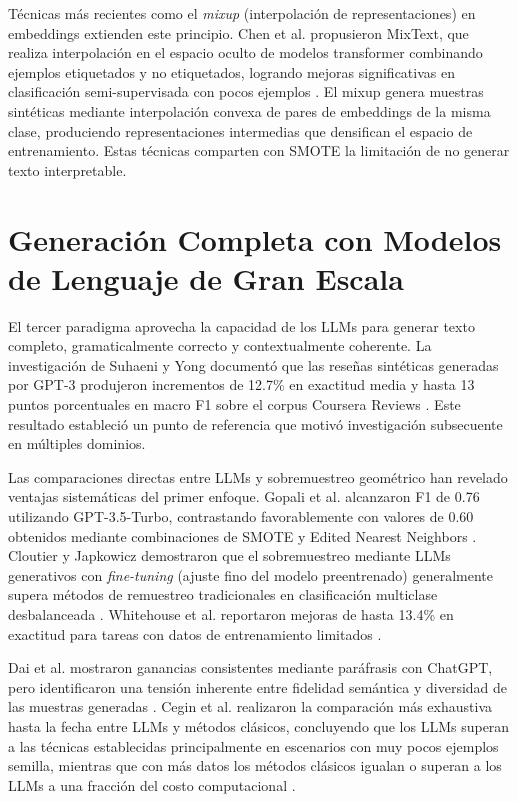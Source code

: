Técnicas más recientes como el \textit{mixup} (interpolación de representaciones) en embeddings extienden este principio. Chen et al. propusieron MixText, que realiza interpolación en el espacio oculto de modelos transformer combinando ejemplos etiquetados y no etiquetados, logrando mejoras significativas en clasificación semi-supervisada con pocos ejemplos \cite{chen2020mixtext}. El mixup genera muestras sintéticas mediante interpolación convexa de pares de embeddings de la misma clase, produciendo representaciones intermedias que densifican el espacio de entrenamiento. Estas técnicas comparten con SMOTE la limitación de no generar texto interpretable.

\section{Generación Completa con Modelos de Lenguaje de Gran Escala}

El tercer paradigma aprovecha la capacidad de los LLMs para generar texto completo, gramaticalmente correcto y contextualmente coherente. La investigación de Suhaeni y Yong documentó que las reseñas sintéticas generadas por GPT-3 produjeron incrementos de 12.7\% en exactitud media y hasta 13 puntos porcentuales en macro F1 sobre el corpus Coursera Reviews \cite{suhaeni2023mitigating}. Este resultado estableció un punto de referencia que motivó investigación subsecuente en múltiples dominios.

Las comparaciones directas entre LLMs y sobremuestreo geométrico han revelado ventajas sistemáticas del primer enfoque. Gopali et al. alcanzaron F1 de 0.76 utilizando GPT-3.5-Turbo, contrastando favorablemente con valores de 0.60 obtenidos mediante combinaciones de SMOTE y Edited Nearest Neighbors \cite{gopali2024applicability}. Cloutier y Japkowicz demostraron que el sobremuestreo mediante LLMs generativos con \textit{fine-tuning} (ajuste fino del modelo preentrenado) generalmente supera métodos de remuestreo tradicionales en clasificación multiclase desbalanceada \cite{cloutier2023fine}. Whitehouse et al. reportaron mejoras de hasta 13.4\% en exactitud para tareas con datos de entrenamiento limitados \cite{whitehouse2023llm}.

Dai et al. mostraron ganancias consistentes mediante paráfrasis con ChatGPT, pero identificaron una tensión inherente entre fidelidad semántica y diversidad de las muestras generadas \cite{dai2023auggpt}. Cegin et al. realizaron la comparación más exhaustiva hasta la fecha entre LLMs y métodos clásicos, concluyendo que los LLMs superan a las técnicas establecidas principalmente en escenarios con muy pocos ejemplos semilla, mientras que con más datos los métodos clásicos igualan o superan a los LLMs a una fracción del costo computacional \cite{cegin2025llms}.

